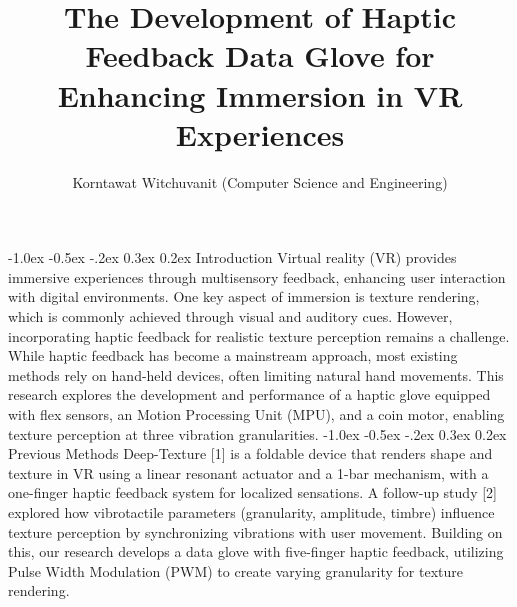 \documentclass[a4paper,twocolumn]{article}
\title{\textbf{The Development of Haptic Feedback Data Glove for Enhancing Immersion in VR Experiences}}
\author{\small{Korntawat Witchuvanit (Computer Science and Engineering)}}
\date{\vspace{-3em}}
\begin{document}
\small
\maketitle

\makeatletter
\renewcommand\section{\@startsection{section}{1}{\z@}%
  {-1.0ex \@plus -0.5ex \@minus -.2ex}%
  {0.3ex \@plus 0.2ex}%
  {\normalfont\small\bfseries}}
\makeatother



\section{Introduction}
Virtual reality (VR) provides immersive experiences through multisensory feedback, enhancing user interaction with digital environments. One key aspect of immersion is texture rendering, which is commonly achieved through visual and auditory cues. However, incorporating haptic feedback for realistic texture perception remains a challenge. While haptic feedback has become a mainstream approach, most existing methods rely on hand-held devices, often limiting natural hand movements. This research explores the development and performance of a haptic glove equipped with flex sensors, an Motion Processing Unit (MPU), and a coin motor, enabling texture perception at three vibration granularities.
\section{Previous Methods}
Deep-Texture [1] is a foldable device that renders shape and texture in VR using a linear resonant actuator and a 1-bar mechanism, with a one-finger haptic feedback system for localized sensations. A follow-up study [2] explored how vibrotactile parameters (granularity, amplitude, timbre) influence texture perception by synchronizing vibrations with user movement. Building on this, our research develops a data glove with five-finger haptic feedback, utilizing Pulse Width Modulation (PWM) to create varying granularity for texture rendering.
\end{document}
